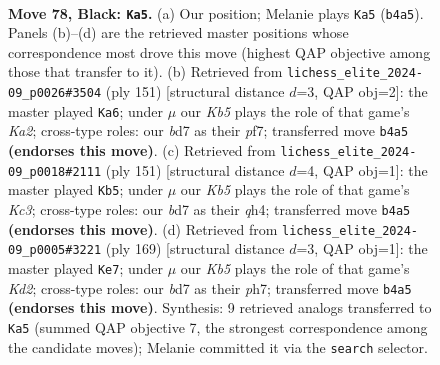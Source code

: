 \documentclass[11pt]{article}
\begin{document}
\clearpage

\begin{figure}[p]\centering
\begin{subfigure}{0.46\textwidth}\centering
\resizebox{\linewidth}{!}{%
\newchessgame
\chessboard[
  setfen={7R/3B1P2/8/8/1k5P/8/5K2/8 b - - 0 78},
  showmover=false,
  pgfstyle=straightmove, color=movearrow, markmove={b4-a5}
]}
\caption{}
\end{subfigure}\hfill
\begin{subfigure}{0.46\textwidth}\centering
\resizebox{\linewidth}{!}{%
\newchessgame
\chessboard[
  setfen={7R/k4P2/2K5/8/7P/8/8/8 b - - 0 76},
  showmover=false,
  pgfstyle=straightmove, color=movearrow, markmove={a7-a6}
]}
\caption{}
\end{subfigure}
\\[4pt]
\begin{subfigure}{0.46\textwidth}\centering
\resizebox{\linewidth}{!}{%
\newchessgame
\chessboard[
  setfen={8/6K1/2k5/8/7Q/1P6/8/1R6 b - - 2 76},
  showmover=false,
  pgfstyle=straightmove, color=movearrow, markmove={c6-b5}
]}
\caption{}
\end{subfigure}\hfill
\begin{subfigure}{0.46\textwidth}\centering
\resizebox{\linewidth}{!}{%
\newchessgame
\chessboard[
  setfen={8/3k3P/6R1/2K5/6P1/8/8/8 b - - 0 85},
  showmover=false,
  pgfstyle=straightmove, color=movearrow, markmove={d7-e7}
]}
\caption{}
\end{subfigure}
\caption{\textbf{Move 78, Black: \texttt{Ka5}.} (a) Our position; Melanie plays \texttt{Ka5} (\texttt{b4a5}). Panels (b)--(d) are the retrieved master positions whose correspondence most drove this move (highest QAP objective among those that transfer to it). (b) Retrieved from \texttt{lichess\_elite\_2024-09\_p0026\#3504} (ply 151) [structural distance $d$=3, QAP obj=2]: the master played \texttt{Ka6}; under $\mu$ our \emph{Kb5} plays the role of that game's \emph{Ka2}; cross-type roles: our \emph{b}d7 as their \emph{p}f7; transferred move \texttt{b4a5} \textbf{(endorses this move)}. (c) Retrieved from \texttt{lichess\_elite\_2024-09\_p0018\#2111} (ply 151) [structural distance $d$=4, QAP obj=1]: the master played \texttt{Kb5}; under $\mu$ our \emph{Kb5} plays the role of that game's \emph{Kc3}; cross-type roles: our \emph{b}d7 as their \emph{q}h4; transferred move \texttt{b4a5} \textbf{(endorses this move)}. (d) Retrieved from \texttt{lichess\_elite\_2024-09\_p0005\#3221} (ply 169) [structural distance $d$=3, QAP obj=1]: the master played \texttt{Ke7}; under $\mu$ our \emph{Kb5} plays the role of that game's \emph{Kd2}; cross-type roles: our \emph{b}d7 as their \emph{p}h7; transferred move \texttt{b4a5} \textbf{(endorses this move)}. Synthesis: 9 retrieved analogs transferred to \texttt{Ka5} (summed QAP objective 7, the strongest correspondence among the candidate moves); Melanie committed it via the \texttt{search} selector.}
\label{fig:thought-m155}
\end{figure}
\end{document}
